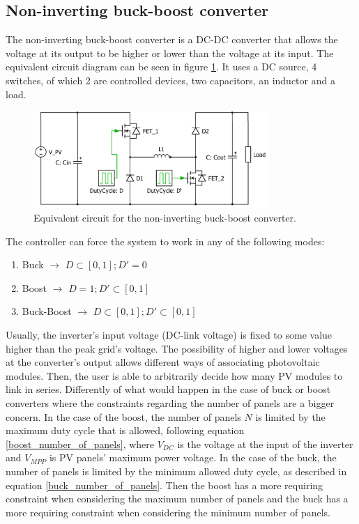 
\subsection{Non-inverting buck-boost converter\label{N_INV_BB}}
		
The non-inverting buck-boost converter is a DC-DC converter that allows the voltage at its output to be higher or lower than the voltage at its input. The equivalent circuit diagram can be seen in figure \ref{N_INV_BB_SCHEMATIC}. It uses a DC source, 4 switches, of which 2 are controlled devices, two capacitors, an inductor and a load.
		
\begin{figure}[H]
	\begin{center}
	\includegraphics[width=0.8\textwidth]{../Pictures/2_d_H_B_BB}
	\caption{Equivalent circuit for the non-inverting buck-boost converter.}
	\label{N_INV_BB_SCHEMATIC}
	\end{center}	
\end{figure}
	
The controller can force the system to work in any of the following modes:

\begin{enumerate}
	\item Buck $\rightarrow$ $ D \subset [0,1];	 D' = 0 $
	\item Boost $\rightarrow$ $ D = 1;	 D' \subset [0,1] $
	\item Buck-Boost $\rightarrow$ $ D \subset [0,1]; D' \subset [0,1] $
\end{enumerate}
		
Usually, the inverter's input voltage (DC-link voltage) is fixed to some value higher than the peak grid's voltage. The possibility of higher and lower voltages at the converter's output allows different ways of associating photovoltaic modules. Then, the user is able to arbitrarily decide how many PV modules to link in series. Differently of what would happen in the case of buck or boost converters where the constraints regarding the number of panels are a bigger concern. In the case of the boost, the number of panels $N$ is limited by the maximum duty cycle that is allowed, following equation \ref{boost_number_of_panels}, where $V_{DC} $ is the voltage at the input of the inverter and $V_{MPP}$ is PV panels' maximum power voltage. In the case of the buck, the number of panels is limited by the minimum allowed duty cycle, as described in equation \ref{buck_number_of_panels}. Then the boost has a more requiring constraint when considering the maximum number of panels and the buck has a more requiring constraint when considering the minimum number of panels.

